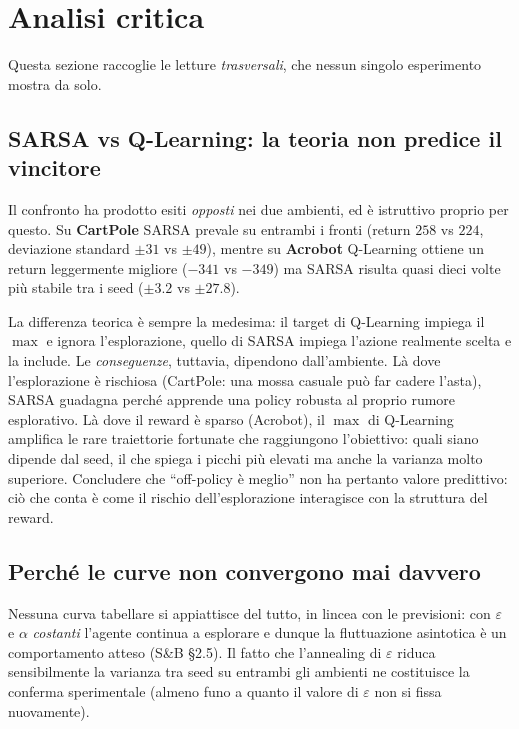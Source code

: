 \section{Analisi critica}
\label{sec:discussion}

Questa sezione raccoglie le letture \emph{trasversali}, che nessun singolo esperimento
mostra da solo.

\subsection{SARSA vs Q-Learning: la teoria non predice il vincitore}
Il confronto ha prodotto esiti \emph{opposti} nei due ambienti, ed \`e istruttivo
proprio per questo. Su \textbf{CartPole} SARSA prevale su entrambi i fronti (return
$258$ vs $224$, deviazione standard $\pm 31$ vs $\pm 49$), mentre su \textbf{Acrobot}
Q\hbox{-}Learning ottiene un return leggermente migliore ($-341$ vs $-349$) ma SARSA
risulta quasi dieci volte pi\`u stabile tra i seed ($\pm 3.2$ vs $\pm 27.8$).

La differenza teorica \`e sempre la medesima: il target di Q\hbox{-}Learning impiega il
$\max$ e ignora l'esplorazione, quello di SARSA impiega l'azione realmente scelta e la
include. Le \emph{conseguenze}, tuttavia, dipendono dall'ambiente. L\`a dove
l'esplorazione \`e rischiosa (CartPole: una mossa casuale pu\`o far cadere l'asta),
SARSA guadagna perch\'e apprende una policy robusta al proprio rumore esplorativo. L\`a
dove il reward \`e sparso (Acrobot), il $\max$ di Q\hbox{-}Learning amplifica le rare
traiettorie fortunate che raggiungono l'obiettivo: quali siano dipende dal seed, il che
spiega i picchi pi\`u elevati ma anche la varianza molto superiore. Concludere che
``off-policy \`e meglio'' non ha pertanto valore predittivo: ci\`o che conta \`e come il
rischio dell'esplorazione interagisce con la struttura del reward.

\subsection{Perch\'e le curve non convergono mai davvero}
Nessuna curva tabellare si appiattisce del tutto, in lincea con le previsioni: con $\varepsilon$ e
$\alpha$ \emph{costanti} l'agente continua a esplorare e dunque la fluttuazione
asintotica \`e un comportamento atteso (S\&B \S2.5). Il fatto che l'annealing di
$\varepsilon$ riduca sensibilmente la varianza tra seed su entrambi gli ambienti ne
costituisce la conferma sperimentale (almeno funo a quanto il valore di $\varepsilon$ non si fissa nuovamente).

